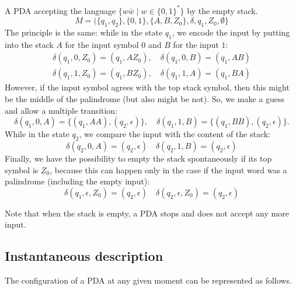 \begin{page}
\setcounter{section}{6}
\setcounter{subsection}{1}
\setcounter{dfn}{5}
\label{portion:1123}

\begin{exl}
\label{exl:Palindromes}
A PDA accepting the language $\{w \bar{w} \mid w \in \{0,1\}^*\}$ by the empty stack.
\[
M = (\{q_1, q_2\}, \{0, 1\}, \{A, B, Z_0\}, \delta, q_1, Z_0, \emptyset\}
\]
The principle is the same: while in the state $q_1$, we encode the input by putting into the stack $A$ for the input symbol $0$ and $B$ for the input $1$:
\begin{gather*}
\delta(q_1, 0, Z_0) = (q_1, AZ_0), \quad \delta(q_1, 0, B) = (q_1, AB)\\
\delta(q_1, 1, Z_0) = (q_1, BZ_0), \quad \delta(q_1, 1, A) = (q_1, BA)
\end{gather*}
However, if the input symbol agrees with the top stack symbol, then this might be the middle of the palindrome (but also might be not).
So, we make a guess and allow a multiple transition:
\[
\delta(q_1, 0, A) = \{(q_1, AA), (q_2, \epsilon)\}, \quad \delta(q_1, 1, B) = \{(q_1, BB), (q_2, \epsilon)\}.
\]
While in the state $q_2$, we compare the input with the content of the stack:
\[
\delta(q_2, 0, A) = (q_2, \epsilon) \quad \delta(q_2, 1, B) = (q_2, \epsilon)
\]
Finally, we have the possibility to empty the stack spontaneously if its top symbol is $Z_0$,
because this can happen only in the case if the input word was a palindrome (including the empty input):
\[
\delta(q_1, \epsilon, Z_0) = (q_2, \epsilon) \quad \delta(q_2, \epsilon, Z_0) = (q_2, \epsilon)
\]
\end{exl}

\end{page}

\begin{page}
\setcounter{section}{6}
\setcounter{subsection}{2}
\setcounter{dfn}{5}
\label{portion:1124}


Note that when the stack is empty, a PDA stops and does not accept any more input.



\end{page}

\begin{page}
\setcounter{section}{6}
\setcounter{subsection}{2}
\setcounter{dfn}{5}
\label{portion:1125}

\subsection{Instantaneous description}
The configuration of a PDA at any given moment can be represented as follows.


\end{page}

